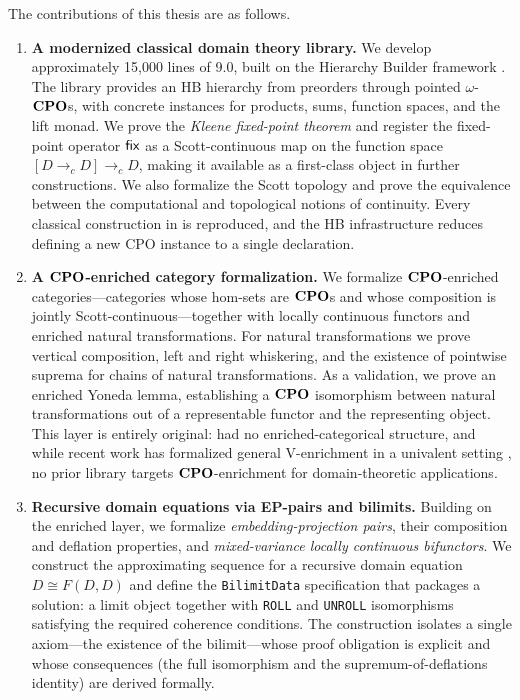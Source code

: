 The contributions of this thesis are as follows.

\begin{enumerate}

\item \textbf{A modernized classical domain theory library.}
  We develop approximately 15{,}000 lines of \Rocq{} 9.0, built on the Hierarchy Builder framework 
  \cite{HB2023}. The library provides an HB hierarchy from preorders through pointed $\omega$-$\mathbf{CPO}$s, 
  with concrete instances for products, sums, function spaces, and the lift monad. We prove the 
  \emph{Kleene fixed-point theorem} and register the fixed-point operator $\mathsf{fix}$ as a Scott-continuous 
  map on the function space $[D \to_{c} D] \to_{c} D$, making it available as a first-class object in 
  further constructions. We also formalize the Scott topology and prove the equivalence between the 
  computational and topological notions of continuity. Every classical construction in \cite{BKV2009} 
  is reproduced, and the HB infrastructure reduces defining a new CPO instance to a single declaration.

\item \textbf{A $\mathbf{CPO}$-enriched category formalization.}
  We formalize $\mathbf{CPO}$-enriched categories---categories whose hom-sets are $\mathbf{CPO}$s and whose composition 
  is jointly Scott-continuous---together with locally continuous functors and enriched natural 
  transformations. For natural transformations we prove vertical composition, left and right whiskering, 
  and the existence of pointwise suprema for chains of natural transformations. As a validation, we prove 
  an enriched Yoneda lemma, establishing a $\mathbf{CPO}$ isomorphism between natural transformations out of a 
  representable functor and the representing object. This layer is entirely original: \cite{BKV2009} had no 
  enriched-categorical structure, and while recent work has formalized general V-enrichment in a univalent 
  setting \cite{VanDerWeide2024}, no prior library targets $\mathbf{CPO}$-enrichment for domain-theoretic applications.

\item \textbf{Recursive domain equations via EP-pairs and bilimits.}
  Building on the enriched layer, we formalize \textit{embedding-projection pairs}, their composition 
  and deflation properties, and \textit{mixed-variance locally continuous bifunctors}. We construct the 
  approximating sequence for a recursive domain equation $D \cong F(D, D)$ and define the 
  \texttt{BilimitData} specification that packages a solution: a limit object together with 
  \texttt{ROLL} and \texttt{UNROLL} isomorphisms satisfying the required coherence conditions. 
  The construction isolates a single axiom---the existence of the bilimit---whose proof obligation 
  is explicit and whose consequences (the full isomorphism and the supremum-of-deflations identity) 
  are derived formally.


\end{enumerate}
